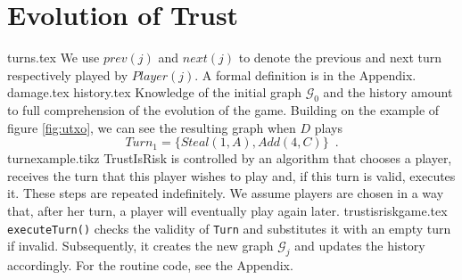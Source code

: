 \section{Evolution of Trust}
  {turns.tex}
  We use $prev\left(j\right)$ and $next\left(j\right)$ to denote the previous and next turn respectively played by
  $Player(j)$. A formal definition is in the Appendix.
  {damage.tex}
  {history.tex}
  Knowledge of the initial graph $\mathcal{G}_0$ and the history amount to full comprehension of the evolution of the
  game. Building on the example of figure \ref{fig:utxo}, we can see the resulting graph when $D$ plays
  \begin{equation}
  \label{turnexample}
     Turn_1 = \{Steal\left(1, A\right), Add\left(4, C\right)\} \enspace.
  \end{equation}
  {turnexample.tikz}
  TrustIsRisk is controlled by an algorithm that chooses a player, receives the turn that
  this player wishes to play and, if this turn is valid, executes it. These steps are repeated indefinitely. We assume
  players are chosen in a way that, after her turn, a player will eventually play again later.
  {trustisriskgame.tex}
  \texttt{executeTurn()} checks the validity of \texttt{Turn} and substitutes it with an empty turn if invalid.
  Subsequently, it creates the new graph $\mathcal{G}_j$ and updates the history accordingly. For the routine code,
  see the Appendix.
